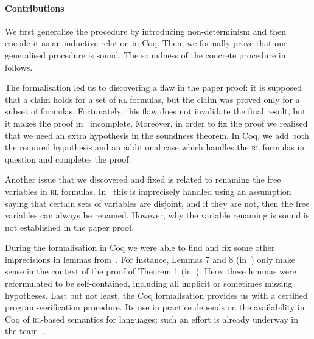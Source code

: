 \documentclass[conference]{IEEEtran}
\newenvironment{todo}{\medskip\hrule\smallskip\noindent}{\smallskip\hrule\medskip}
\newcommand{\dl}[1]{\begin{todo}\textcolor{blue}{Dorel:}\\ \color{red}{#1}\color{black}\end{todo}}
\newcommand{\dl}[1]{}
\newcommand{\ML}{\textsc{ml}\xspace}
\newcommand{\RL}{\textsc{rl}\xspace}
\begin{document}
\paragraph{Contributions}
We first generalise the procedure by introducing non-determinism and then encode it as an inductive relation in Coq.
Then, we formally prove that our generalised procedure is sound. 
The soundness of the concrete procedure in~\cite{lucanu-rusu-arusoaie-nowak-LRC2015}  follows.

The formalisation led us to discovering a flaw in the paper proof: 
it is supposed that a claim holds for a set of \RL formulas, but the claim was proved only for a subset of formulas.
Fortunately, this flaw does not invalidate the final result, but it makes the proof in~\cite{lucanu-rusu-arusoaie-nowak-LRC2015} incomplete.
Moreover, in order to fix the proof we realised that we need an extra hypothesis in the soundness theorem.
In Coq, we add both the required hypothesis and an additional case which handles the \RL formulas in question and completes the proof.


Another issue that we discovered and fixed is related to renaming the free variables in \RL formulas.
In~\cite{lucanu-rusu-arusoaie-nowak-LRC2015} this is imprecisely handled using an assumption saying that certain sets of variables are disjoint, and if they are not, then the free variables can always be renamed. 
However, why the variable renaming is sound is not established in the paper proof.


During the formalisation in Coq we were able to find and fix some other imprecisions in lemmas from~\cite{lucanu-rusu-arusoaie-nowak-LRC2015}.
For instance, Lemmas 7 and 8 (in~\cite{lucanu-rusu-arusoaie-nowak-LRC2015}) only make sense in the context of the proof of Theorem 1 (in~\cite{lucanu-rusu-arusoaie-nowak-LRC2015}). 
Here, these lemmas were reformulated to be self-contained, including all implicit or sometimes missing hypotheses.
Last but not least, the Coq formalisation provides us with a certified program-verification procedure. Its use in practice depends on the availability in Coq of \RL-based semantics for languages; such an effort is already underway in the \K team~\cite{moore-rosu-2015-tr}.
\end{document}
